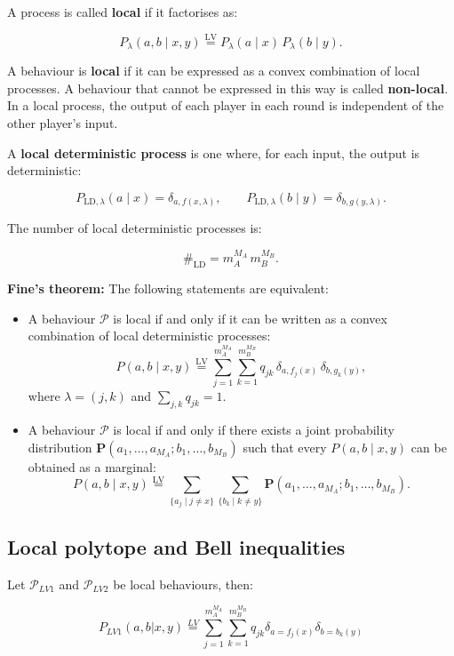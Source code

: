 \documentclass[12pt, letterpaper]{article}
\begin{document}
A process is called \textbf{local} if it factorises as:

\[
P_\lambda(a,b \mid x,y) \stackrel{\text{LV}}{=} P_\lambda(a \mid x) \, P_\lambda(b \mid y).
\]

A behaviour is \textbf{local} if it can be expressed as a convex combination of local processes. A behaviour that cannot be expressed in this way is called \textbf{non-local}. In a local process, the output of each player in each round is independent of the other player's input.

A \textbf{local deterministic process} is one where, for each input, the output is deterministic:

\[
P_{\text{LD},\lambda}(a \mid x) = \delta_{a, f(x,\lambda)}, \qquad
P_{\text{LD},\lambda}(b \mid y) = \delta_{b, g(y,\lambda)}.
\]

The number of local deterministic processes is:

\[
\#_{\text{LD}} = m_A^{M_A} \, m_B^{M_B}.
\]

\textbf{Fine's theorem:} The following statements are equivalent:
\begin{itemize}
    \item A behaviour $\mathcal{P}$ is local if and only if it can be written as a convex combination of local deterministic processes:
    \[
    P(a,b \mid x,y) \stackrel{\text{LV}}{=} \sum_{j=1}^{m_A^{M_A}} \sum_{k=1}^{m_B^{M_B}} q_{jk} \, \delta_{a, f_j(x)} \, \delta_{b, g_k(y)},
    \]
    where $\lambda = (j,k)$ and $\sum_{j,k} q_{jk} = 1$.

    \item A behaviour $\mathcal{P}$ is local if and only if there exists a joint probability distribution $\boldsymbol{P}(a_1,\dots, a_{M_A}; b_1 , \dots, b_{M_B})$ such that every $P(a,b \mid x,y)$ can be obtained as a marginal:
    \[
    P(a,b \mid x,y) \stackrel{\text{LV}}{=} \sum_{\{a_j \mid j\neq x\}} \sum_{\{b_k \mid k\neq y\}} \boldsymbol{P}(a_1, \dots , a_{M_A}; b_1, \dots, b_{M_B}).
    \]
\end{itemize}

\subsection{Local polytope and Bell inequalities}

Let $\mathcal{P}_{LV1}$ and $\mathcal{P}_{LV2}$ be local behaviours, then:

\[
P_{LV1}(a, b|x, y) \overset{LV}{=} \sum_{j=1}^{m_A^{M_A}} \sum_{k=1}^{m_B^{M_B}} q_{jk} \delta_{a=f_j(x)} \delta_{b=b_k(y)}
\]
\end{document}
